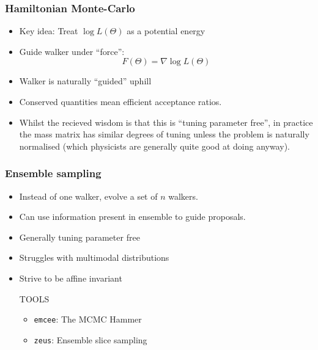 \documentclass[aspectratio=169]{beamer}
\begin{document}
\begin{frame}
    \frametitle{Hamiltonian Monte-Carlo} 
    \begin{itemize}
        \item Key idea: Treat $\log L(\Theta)$ as a potential energy
        \item Guide walker under ``force'': \[F(\Theta) =\nabla \log L(\Theta)\]
        \item Walker is naturally ``guided'' uphill
        \item Conserved quantities mean efficient acceptance ratios.
        \item Whilst the recieved wisdom is that this is ``tuning parameter free'', in practice the mass matrix has similar degrees of tuning unless the problem is naturally normalised (which physicists are generally quite good at doing anyway).
    \end{itemize}
\end{frame}

\begin{frame}
    \frametitle{Ensemble sampling} 
    \begin{itemize}
        \item Instead of one walker, evolve a set of $n$ walkers.
        \item Can use information present in ensemble to guide proposals.
        \item Generally tuning parameter free
        \item Struggles with multimodal distributions
        \item Strive to be affine invariant
    \begin{block}{TOOLS}
        \begin{itemize}
            \item \texttt{emcee}: The MCMC Hammer~
            \item \texttt{zeus}: Ensemble slice sampling~
        \end{itemize}
    \end{block}
    \end{itemize}
\end{frame}
\end{document}
